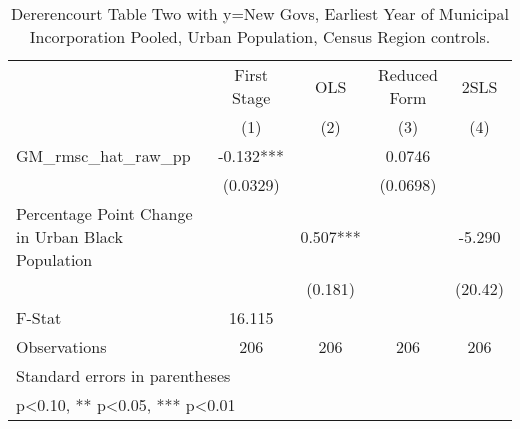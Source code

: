 \begin{table}[htbp]\centering
\def\sym#1{\ifmmode^{#1}\else\(^{#1}\)\fi}
\caption{Dererencourt Table Two with y=New Govs, Earliest Year of Municipal Incorporation  Pooled, Urban Population, Census Region controls.}
\begin{tabular}{l*{4}{c}}
\toprule
                    & First Stage   &         OLS   &Reduced Form   &        2SLS   \\
                    &\multicolumn{1}{c}{(1)}   &\multicolumn{1}{c}{(2)}   &\multicolumn{1}{c}{(3)}   &\multicolumn{1}{c}{(4)}   \\
\midrule
GM\_rmsc\_hat\_raw\_pp  &      -0.132***&               &      0.0746   &               \\
                    &    (0.0329)   &               &    (0.0698)   &               \\
\addlinespace
Percentage Point Change in Urban Black Population&               &       0.507***&               &      -5.290   \\
                    &               &     (0.181)   &               &     (20.42)   \\
\midrule
F-Stat              &      16.115   &               &               &               \\
Observations        &         206   &         206   &         206   &         206   \\
\bottomrule
\multicolumn{5}{l}{\footnotesize Standard errors in parentheses}\\
\multicolumn{5}{l}{\footnotesize * p<0.10, ** p<0.05, *** p<0.01}\\
\end{tabular}
\end{table}

